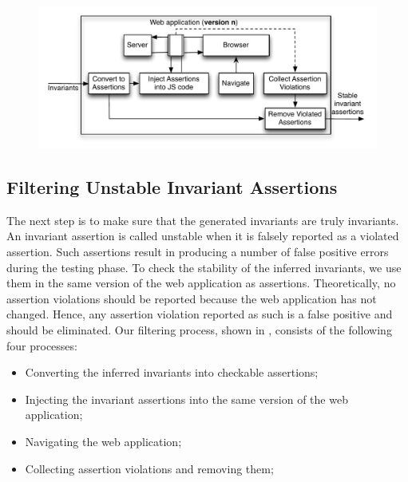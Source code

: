 \begin{figure}[t]
\centering
\includegraphics[width=0.9\hsize]{fig/filter-test}
\label{Fig:filtering}
\end{figure}


\subsection{Filtering Unstable Invariant Assertions}
\label{Sec:filtering}
The next step is to make sure that the generated invariants are truly invariants. 
An invariant assertion is called unstable when it is falsely reported as a violated assertion. Such assertions result in producing a number of false positive errors 
during the testing phase. 
To check the stability of the inferred invariants, we use them in the same version of the web application as assertions. Theoretically, no assertion violations should be reported because the web application has not changed. Hence, any assertion violation reported as such is a false positive and should be eliminated. Our filtering process, shown in , consists of the following four processes:

\begin{itemize}
\item Converting the inferred invariants into checkable assertions;
\item Injecting the invariant assertions into the same version of the web application;
\item Navigating the web application;
\item Collecting assertion violations and removing them;
\end{itemize}



